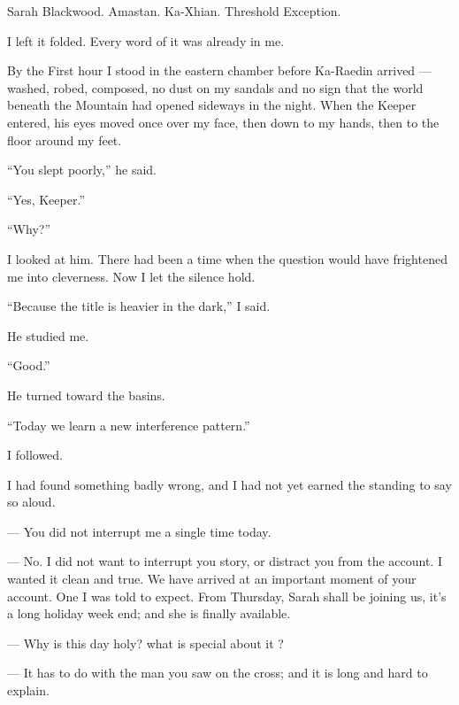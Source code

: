 Sarah Blackwood. Amastan. Ka-Xhian. Threshold Exception.\par

I left it folded. Every word of it was already in me.\par

By the First hour I stood in the eastern chamber before Ka-Raedin arrived --- washed, robed, composed, no dust on my sandals and no sign that the world beneath the Mountain had opened sideways in the night. When the Keeper entered, his eyes moved once over my face, then down to my hands, then to the floor around my feet.\par

``You slept poorly,'' he said.\par

``Yes, Keeper.''\par

``Why?''\par

I looked at him. There had been a time when the question would have frightened me into cleverness. Now I let the silence hold.\par

``Because the title is heavier in the dark,'' I said.\par

He studied me.\par

``Good.''\par

He turned toward the basins.\par

``Today we learn a new interference pattern.''\par

I followed.\par

I had found something badly wrong, and I had not yet earned the standing to say so aloud.\par

\begin{room}

--- You did not interrupt me a single time today.

--- No. I did not want to interrupt you story, or distract you from the account. I wanted it clean and true. We have arrived at an important moment of your account. One I was told to expect. From Thursday, Sarah shall be joining us, it's a long holiday week end; and she is finally available.

--- Why is this day holy? what is special about it ?

--- It has to do with the man you saw on the cross; and it is long and hard to explain. 

\end{room}